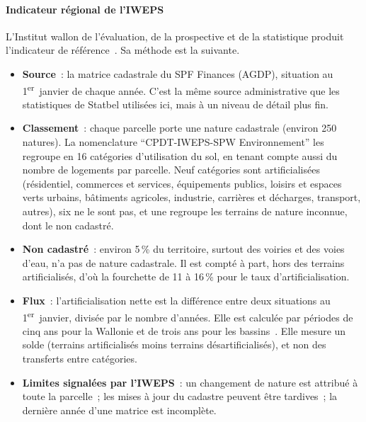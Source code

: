 \documentclass[11pt,a4paper]{report}
\begin{document}
\paragraph{Indicateur régional de l'IWEPS} L'Institut wallon de l'évaluation, de la prospective et de la statistique produit l'indicateur de référence~\citep{iweps_t005,iweps_rs12}. Sa méthode est la suivante.
\begin{itemize}
\item \textbf{Source}~: la matrice cadastrale du SPF Finances (AGDP), situation au 1\textsuperscript{er}~janvier de chaque année. C'est la même source administrative que les statistiques de Statbel utilisées ici, mais à un niveau de détail plus fin.
\item \textbf{Classement}~: chaque parcelle porte une nature cadastrale (environ 250 natures). La nomenclature \enquote{CPDT-IWEPS-SPW Environnement} les regroupe en 16 catégories d'utilisation du sol, en tenant compte aussi du nombre de logements par parcelle. Neuf catégories sont artificialisées (résidentiel, commerces et services, équipements publics, loisirs et espaces verts urbains, bâtiments agricoles, industrie, carrières et décharges, transport, autres), six ne le sont pas, et une regroupe les terrains de nature inconnue, dont le non cadastré.
\item \textbf{Non cadastré}~: environ 5\,\% du territoire, surtout des voiries et des voies d'eau, n'a pas de nature cadastrale. Il est compté à part, hors des terrains artificialisés, d'où la fourchette de 11 à 16\,\% pour le taux d'artificialisation.
\item \textbf{Flux}~: l'artificialisation nette est la différence entre deux situations au 1\textsuperscript{er}~janvier, divisée par le nombre d'années. Elle est calculée par périodes de cinq ans pour la Wallonie et de trois ans pour les bassins~\citep{cpdt_monitoring2025}. Elle mesure un solde (terrains artificialisés moins terrains désartificialisés), et non des transferts entre catégories.
\item \textbf{Limites signalées par l'IWEPS}~: un changement de nature est attribué à toute la parcelle~; les mises à jour du cadastre peuvent être tardives~; la dernière année d'une matrice est incomplète.
\end{itemize}
\end{document}
